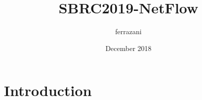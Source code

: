 \documentclass{article}
\title{SBRC2019-NetFlow}
\author{ferrazani }
\date{December 2018}
\begin{document}
\maketitle

\section{Introduction}
\end{document}
